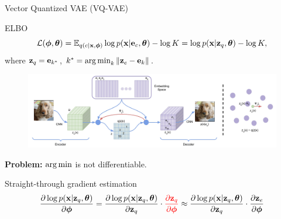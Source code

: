\begin{frame}{Vector Quantized VAE (VQ-VAE)}
	\begin{block}{ELBO}
		\vspace{-0.6cm}
		\[
		\mathcal{L} (\boldsymbol{\phi}, \boldsymbol{\theta})  = \mathbb{E}_{q(c | \mathbf{x}, \boldsymbol{\phi})} \log p(\mathbf{x} | \mathbf{e}_{c} , \boldsymbol{\theta}) - \log K =  \log p(\mathbf{x} | \mathbf{z}_q, \boldsymbol{\theta}) - \log K,
		\]
		where $\mathbf{z}_q = \mathbf{e}_{k^*}$, $k^* = \operatorname*{arg\,min}_k \| \mathbf{z}_e - \mathbf{e}_k \|$.
	\end{block}
	\begin{figure}
		\centering
		\includegraphics[width=0.85\linewidth]{figs/vqvae}
	\end{figure}
	\textbf{Problem:} $\operatorname*{arg\,min}$ is not differentiable.
	\begin{block}{Straight-through gradient estimation}
		\vspace{-0.6cm}
		\[
		\frac{\partial \log p(\mathbf{x} | \mathbf{z}_q , \boldsymbol{\theta})}{\partial \boldsymbol{\phi}} = \frac{\partial \log p(\mathbf{x} | \mathbf{z}_q, \boldsymbol{\theta})}{\partial \mathbf{z}_q} \cdot {\color{red}\frac{\partial \mathbf{z}_q}{\partial \boldsymbol{\phi}}} \approx \frac{\partial \log p(\mathbf{x} | \mathbf{z}_q, \boldsymbol{\theta})}{\partial \mathbf{z}_q} \cdot \frac{\partial \mathbf{z}_e}{\partial \boldsymbol{\phi}}
		\]
	\end{block}
\end{frame}

